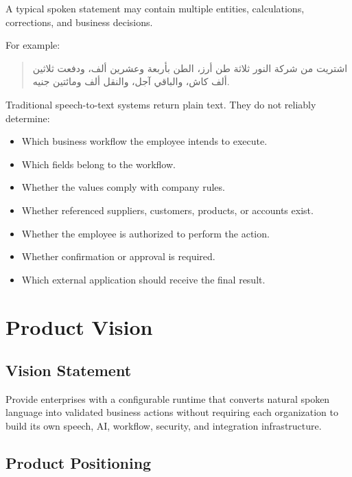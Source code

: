 \documentclass[11pt,a4paper]{article}
\begin{document}
A typical spoken statement may contain multiple entities, calculations,
corrections, and business decisions.

For example:

\begin{quote}
\textarabic{
اشتريت من شركة النور ثلاثة طن أرز، الطن بأربعة وعشرين ألف،
ودفعت ثلاثين ألف كاش، والباقي آجل، والنقل ألف ومائتين جنيه.
}
\end{quote}

Traditional speech-to-text systems return plain text. They do not reliably
determine:

\begin{itemize}
\item Which business workflow the employee intends to execute.
\item Which fields belong to the workflow.
\item Whether the values comply with company rules.
\item Whether referenced suppliers, customers, products, or accounts exist.
\item Whether the employee is authorized to perform the action.
\item Whether confirmation or approval is required.
\item Which external application should receive the final result.
\end{itemize}

\section{Product Vision}

\subsection{Vision Statement}

\begin{decisionbox}
Provide enterprises with a configurable runtime that converts natural
spoken language into validated business actions without requiring each
organization to build its own speech, AI, workflow, security, and
integration infrastructure.
\end{decisionbox}

\subsection{Product Positioning}
\end{document}
